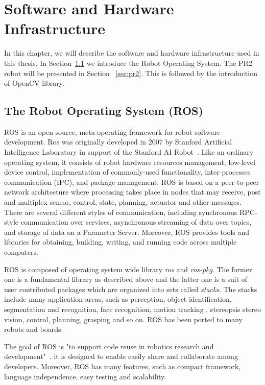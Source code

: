 \chapter{Software and Hardware Infrastructure}
\label{chapter:SHI}
In this chapter, we will describe the software and hardware
infrastructure used in this thesis. In Section~\ref{sec:ros} we introduce the
Robot Operating System. The PR2 robot will be presented in Section
~\ref{sec:pr2}. This is followed by the introduction of OpenCV library.

\section{The Robot Operating System (ROS)}
\label{sec:ros}
ROS is an open-source, meta-operating framework for robot software
development. Ros was originally developed in 2007 by Stanford Artificial Intelligence Laboratory in support of the Stanford AI Robot~\cite{quigley2007stair}. Like an ordinary operating system, it consists of  robot
hardware resources management, low-level device control, implementation
of commonly-used functionality, inter-processes communication (IPC), and package
management. ROS is based on a peer-to-peer network architecture where
processing takes place in nodes that may receive, post and 
multiplex sensor, control, state, planning, actuator and other
messages. There are several different styles of communication, including synchronous RPC-style communication over services, asynchronous
streaming of data over topics, and storage of data on a Parameter
Server.
Moreover, ROS provides tools and libraries for obtaining, building, writing, and
running code across multiple computers.

ROS is composed of operating system wide library \textit{ros} and
\textit{ros-pkg}. The former one is a fundamental library as described
above and the latter one is a suit of user contributed packages which
are organized into sets called \textit{stacks}. The stacks include
many application areas, such as  perception, object identification,
segmentation and recognition, face recognition, motion tracking ,
stereopsis stereo vision, control, planning, grasping and so on. ROS has been ported to many robots and boards.

The goal of ROS is "to support code reuse in robotics research and
development"~\cite{rosintroduction}.  it is designed to enable easily
share and collaborate among developers. Moreover, ROS has many
features, such as compact framework, language independence, easy
testing and scalability.

